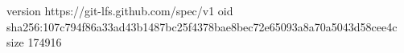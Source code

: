 version https://git-lfs.github.com/spec/v1
oid sha256:107c794f86a33ad43b1487bc25f4378bae8bec72e65093a8a70a5043d58cee4c
size 174916
